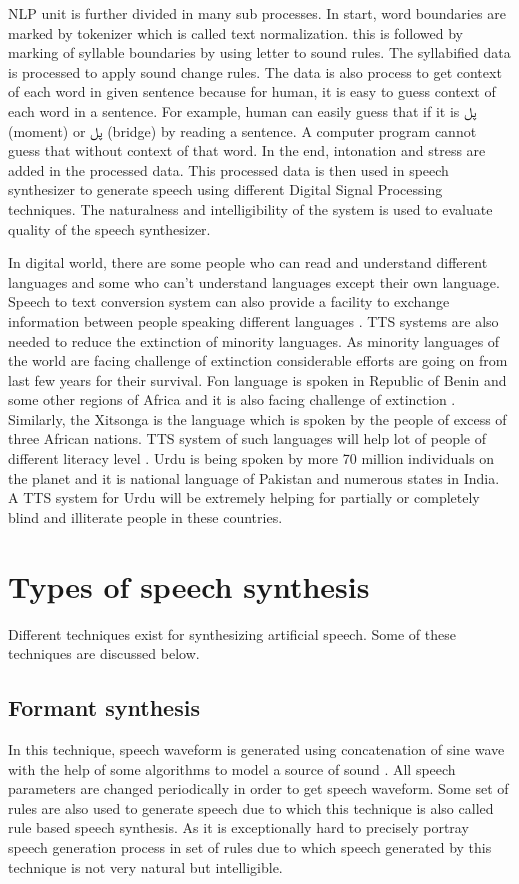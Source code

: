 NLP unit is further divided in many sub processes. In start, word boundaries are marked by tokenizer which is called text normalization. this is followed by marking of syllable boundaries by using letter to sound rules. The syllabified data is processed to apply sound change rules. The data is also process to get context of each word in given sentence because for human, it is easy to guess context of each word in a sentence. For example, human can easily guess that if it is \texturdu{پل} (moment) or \texturdu{پل} (bridge) by reading a sentence. A computer program cannot guess that without context of that word. In the end, intonation and stress are added in the processed data. This processed data is then used in speech synthesizer to generate speech using different Digital Signal Processing techniques. The naturalness and intelligibility of the system is used to evaluate quality of the speech synthesizer.

In digital world, there are some people who can read and understand different languages and some who can’t understand languages except their own language. Speech to text conversion system can also provide a facility to exchange information between people speaking different languages \cite{khilari2015review}. TTS systems are also needed to reduce the extinction of minority languages. As minority languages of the world are facing challenge of extinction considerable efforts are going on from last few years for their survival. Fon language is spoken in Republic of Benin and some other regions of Africa and it is also facing challenge of extinction \cite{dagba2014text}. Similarly, the Xitsonga is the language which is spoken by the people of excess of three African nations. TTS system of such languages will help lot of people of different literacy level \cite{baloyi2012text}. Urdu is being spoken by more 70 million individuals on the planet \cite{top_30_languages} and it is national language of Pakistan and numerous states in India. A TTS system for Urdu will be extremely helping for partially or completely blind and illiterate people in these countries.

\section{Types of speech synthesis}
Different techniques exist for synthesizing artificial speech. Some of these techniques are discussed below.

\subsection{Formant synthesis}
In this technique, speech waveform is generated using concatenation of sine wave with the help of some algorithms to model a source of sound \cite{format_synthesis}. All speech parameters are changed periodically in order to get speech waveform. Some set of rules are also used to generate speech due to which this technique is also called rule based speech synthesis. As it is exceptionally hard to precisely portray speech generation process in set of rules due to which speech generated by this technique is not very natural but intelligible.

